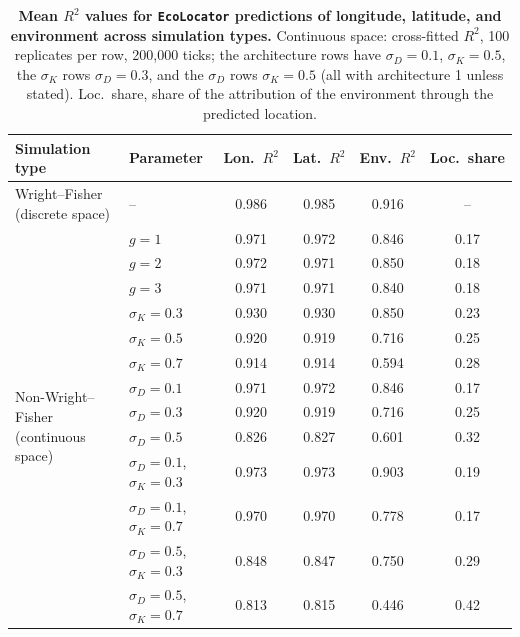 \documentclass[]{article}
\newcommand{\ecolocator}{\texttt{EcoLocator}\xspace}
\begin{document}
\begin{table}[ht]
  \centering
  \caption{\textbf{Mean $R^2$ values for \ecolocator predictions of longitude, latitude, and environment across simulation types.}
  Continuous space: cross-fitted $R^2$, 100 replicates per row, 200,000 ticks;
  the architecture rows have $\sigma_D = 0.1$, $\sigma_K = 0.5$,
  the $\sigma_K$ rows $\sigma_D = 0.3$,
  and the $\sigma_D$ rows $\sigma_K = 0.5$ (all with architecture 1 unless stated).
  Loc.\ share, share of the attribution of the environment
  through the predicted location.}
  \label{tab:supptable2}
  \small
  \setlength{\tabcolsep}{4pt}
  \begin{tabular}{@{}llcccc@{}}
  \hline
  \textbf{Simulation type} & \textbf{Parameter} & \textbf{Lon.\ $R^2$} & \textbf{Lat.\ $R^2$} & \textbf{Env.\ $R^2$} & \textbf{Loc.\ share} \\
  \hline
  Wright--Fisher (discrete space) & -- & 0.986 & 0.985 & 0.916 & -- \\
  \hline
  \multirow{13}{*}{Non-Wright--Fisher (continuous space)}
   & $g=1$ & 0.971 & 0.972 & 0.846 & 0.17 \\
   & $g=2$ & 0.972 & 0.971 & 0.850 & 0.18 \\
   & $g=3$ & 0.971 & 0.971 & 0.840 & 0.18 \\
   \cline{2-6}
   & $\sigma_K=0.3$ & 0.930 & 0.930 & 0.850 & 0.23 \\
   & $\sigma_K=0.5$ & 0.920 & 0.919 & 0.716 & 0.25 \\
   & $\sigma_K=0.7$ & 0.914 & 0.914 & 0.594 & 0.28 \\
   \cline{2-6}
   & $\sigma_D=0.1$ & 0.971 & 0.972 & 0.846 & 0.17 \\
   & $\sigma_D=0.3$ & 0.920 & 0.919 & 0.716 & 0.25 \\
   & $\sigma_D=0.5$ & 0.826 & 0.827 & 0.601 & 0.32 \\
   \cline{2-6}
   & $\sigma_D=0.1$, $\sigma_K=0.3$ & 0.973 & 0.973 & 0.903 & 0.19 \\
   & $\sigma_D=0.1$, $\sigma_K=0.7$ & 0.970 & 0.970 & 0.778 & 0.17 \\
   & $\sigma_D=0.5$, $\sigma_K=0.3$ & 0.848 & 0.847 & 0.750 & 0.29 \\
   & $\sigma_D=0.5$, $\sigma_K=0.7$ & 0.813 & 0.815 & 0.446 & 0.42 \\
  \hline
  \end{tabular}
\end{table}
\end{document}
